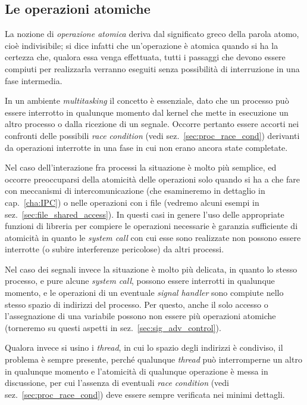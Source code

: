 \subsection{Le operazioni atomiche}
\label{sec:proc_atom_oper}

La nozione di \textsl{operazione atomica} deriva dal significato greco della
parola atomo, cioè indivisibile; si dice infatti che un'operazione è atomica
quando si ha la certezza che, qualora essa venga effettuata, tutti i passaggi
che devono essere compiuti per realizzarla verranno eseguiti senza possibilità
di interruzione in una fase intermedia.

In un ambiente \textit{multitasking} il concetto è essenziale, dato che un
processo può essere interrotto in qualunque momento dal kernel che mette in
esecuzione un altro processo o dalla ricezione di un segnale. Occorre pertanto
essere accorti nei confronti delle possibili \textit{race condition} (vedi
sez.~\ref{sec:proc_race_cond}) derivanti da operazioni interrotte in una fase
in cui non erano ancora state completate.

Nel caso dell'interazione fra processi la situazione è molto più semplice, ed
occorre preoccuparsi della atomicità delle operazioni solo quando si ha a che
fare con meccanismi di intercomunicazione (che esamineremo in dettaglio in
cap.~\ref{cha:IPC}) o nelle operazioni con i file (vedremo alcuni esempi in
sez.~\ref{sec:file_shared_access}). In questi casi in genere l'uso delle
appropriate funzioni di libreria per compiere le operazioni necessarie è
garanzia sufficiente di atomicità in quanto le \textit{system call} con cui
esse sono realizzate non possono essere interrotte (o subire interferenze
pericolose) da altri processi.

Nel caso dei segnali invece la situazione è molto più delicata, in quanto lo
stesso processo, e pure alcune \textit{system call}, possono essere interrotti
in qualunque momento, e le operazioni di un eventuale \textit{signal handler}
sono compiute nello stesso spazio di indirizzi del processo. Per questo, anche
il solo accesso o l'assegnazione di una variabile possono non essere più
operazioni atomiche (torneremo su questi aspetti in
sez.~\ref{sec:sig_adv_control}).

Qualora invece si usino i \textit{thread}, in cui lo spazio degli indirizzi è
condiviso, il problema è sempre presente, perché qualunque \textit{thread} può
interromperne un altro in qualunque momento e l'atomicità di qualunque
operazione è messa in discussione, per cui l'assenza di eventuali \textit{race
  condition} (vedi sez.~\ref{sec:proc_race_cond}) deve essere sempre
verificata nei minimi dettagli.

